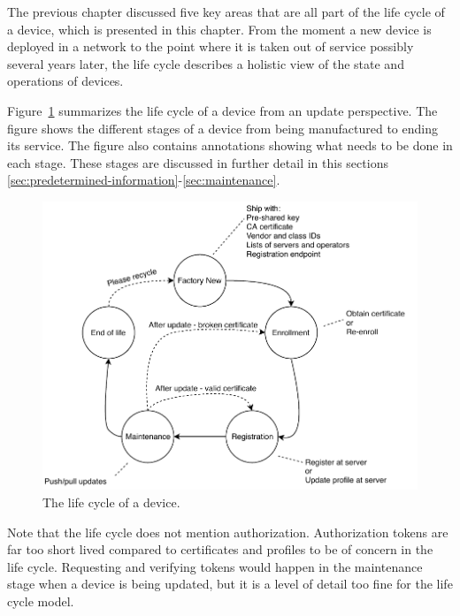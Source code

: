\documentclass[0-thesis.tex]{subfiles}
\begin{document}
The previous chapter discussed five key areas that are all part of the life cycle of a
device, which is presented in this chapter. From the moment a new device is deployed in a
network to the point where it is taken out of service possibly several years later, the
life cycle describes a holistic view of the state and operations of devices.

Figure~\ref{fig:lifecycle} summarizes the life cycle of a device from an update
perspective. The figure shows the different stages of a device from being manufactured to
ending its service. The figure also contains annotations showing what needs to be done in
each stage. These stages are discussed in further detail in this sections
\ref{sec:predetermined-information}-\ref{sec:maintenance}. 

\begin{figure}
    \caption{The life cycle of a device.}
    \label{fig:lifecycle}
    \includegraphics{images/lifecycle.pdf}
\end{figure}

Note that the life cycle does not mention authorization. Authorization tokens are far too
short lived compared to certificates and profiles to be of concern in the life cycle.
Requesting and verifying tokens would happen in the maintenance stage when a device is
being updated, but it is a level of detail too fine for the life cycle model.
\end{document}
